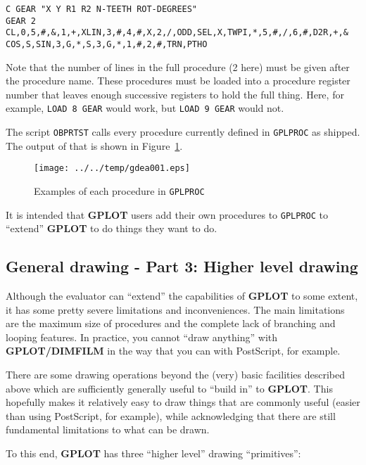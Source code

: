\documentclass[a4paper,twoside,11pt]{article}
\makeatletter
\def\maxwidth{%
  \ifdim\Gin@nat@width>\linewidth
    \linewidth
  \else
    \Gin@nat@width
  \fi
}
\newcommand{\newpara}{\par\vspace{4mm}\noindent}
\makeatother
\begin{document}
\begin{lstlisting}
C GEAR "X Y R1 R2 N-TEETH ROT-DEGREES"
GEAR 2
CL,0,5,#,&,1,+,XLIN,3,#,4,#,X,2,/,ODD,SEL,X,TWPI,*,5,#,/,6,#,D2R,+,&
COS,S,SIN,3,G,*,S,3,G,*,1,#,2,#,TRN,PTHO
\end{lstlisting}

\newpara
Note that the number of lines in the full procedure (2 here) must be
given after the procedure name. These procedures must be loaded into a
procedure register number that leaves enough successive registers to
hold the full thing. Here, for example, \texttt{LOAD\ 8\ GEAR} would
work, but \texttt{LOAD\ 9\ GEAR} would not.

\newpara
The script \texttt{OBPRTST} calls every procedure currently defined in
\texttt{GPLPROC} as shipped. The output of that is shown in
Figure~\ref{fig:gdea001}.

\begin{figure}
  \centering
  \texttt{[image: ../../temp/gdea001.eps]}
  \caption{Examples of each procedure in \texttt{GPLPROC}}
  \label{fig:gdea001}
\end{figure}

\newpara
It is intended that \textbf{GPLOT} users add their own procedures to
\texttt{GPLPROC} to ``extend'' \textbf{GPLOT} to do things they want to do.

\subsection{General drawing - Part 3: Higher level drawing}\label{general-drawing---part-3-higher-level-drawing}

\newpara
Although the evaluator can ``extend'' the capabilities of \textbf{GPLOT} to some
extent, it has some pretty severe limitations and inconveniences. The
main limitations are the maximum size of procedures and the complete
lack of branching and looping features. In practice, you cannot ``draw
anything'' with \textbf{GPLOT/DIMFILM} in the way that you can with PostScript,
for example.

\newpara
There are some drawing operations beyond the (very) basic facilities
described above which are sufficiently generally useful to ``build in''
to \textbf{GPLOT}. This hopefully makes it relatively easy to draw things that
are commonly useful (easier than using PostScript, for example), while
acknowledging that there are still fundamental limitations to what can
be drawn.

\newpara
To this end, \textbf{GPLOT} has three ``higher level'' drawing ``primitives'':
\end{document}
